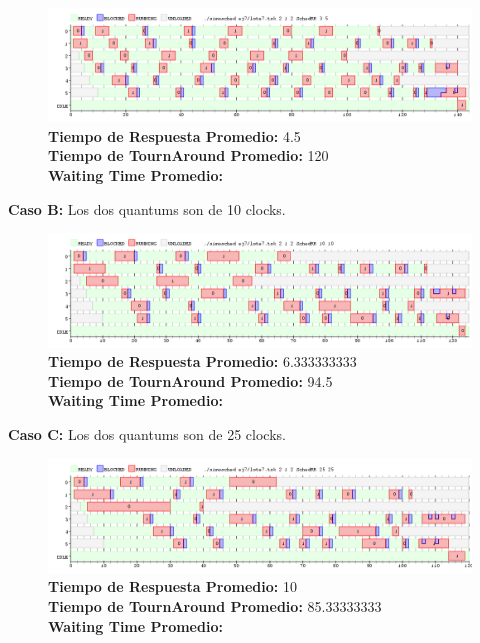 \documentclass[a4paper]{article}
\begin{document}
		 \begin{figure}[h!]
   \begin{center}
 	\includegraphics[scale=0.5]{imagenes/ej7/2nucleoA.png}
 	\textbf{Tiempo de Respuesta Promedio:} 4.5 \\
 	\textbf{Tiempo de TournAround Promedio:} 120 \\
 	\textbf{Waiting Time Promedio:} \\
   \end{center}
 \end{figure} 
 	
	\textbf{Caso B:} Los dos quantums son de 10 clocks.

		 \begin{figure}[h!]
   \begin{center}
 	\includegraphics[scale=0.5]{imagenes/ej7/2nucleoB.png}
 	\textbf{Tiempo de Respuesta Promedio:} 6.333333333\\
 	\textbf{Tiempo de TournAround Promedio:} 94.5\\
 	\textbf{Waiting Time Promedio:} \\
   \end{center}
 \end{figure} 
 	
	\textbf{Caso C:} Los dos quantums son de 25 clocks.

		 \begin{figure}[h!]
   \begin{center}
 	\includegraphics[scale=0.5]{imagenes/ej7/2nucleoC.png}
 	\textbf{Tiempo de Respuesta Promedio:} 10 \\
 	\textbf{Tiempo de TournAround Promedio:} 85.33333333 \\
 	\textbf{Waiting Time Promedio:} \\
   \end{center}
 \end{figure} 
 
\end{document}
